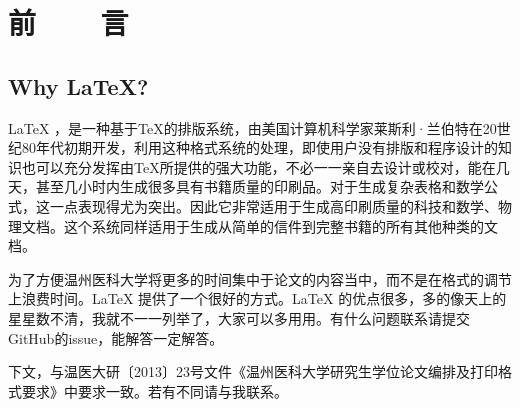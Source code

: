 \chapter{前~~~~言}
\section{Why \LaTeX ? }
\LaTeX{} ，是一种基于\TeX{}的排版系统，由美国计算机科学家莱斯利·兰伯特在20世纪80年代初期开发，利用这种格式系统的处理，即使用户没有排版和程序设计的知识也可以充分发挥由\TeX{}所提供的强大功能，不必一一亲自去设计或校对，能在几天，甚至几小时内生成很多具有书籍质量的印刷品。对于生成复杂表格和数学公式，这一点表现得尤为突出。因此它非常适用于生成高印刷质量的科技和数学、物理文档。这个系统同样适用于生成从简单的信件到完整书籍的所有其他种类的文档。

为了方便温州医科大学将更多的时间集中于论文的内容当中，而不是在格式的调节上浪费时间。\LaTeX{} 提供了一个很好的方式。\LaTeX{} 的优点很多，多的像天上的星星数不清，我就不一一列举了，大家可以多用用。有什么问题联系请提交GitHub的issue，能解答一定解答。
\par 下文，与温医大研〔2013〕23号文件《温州医科大学研究生学位论文编排及打印格式要求》中要求一致。若有不同请与我联系。

\clearpage